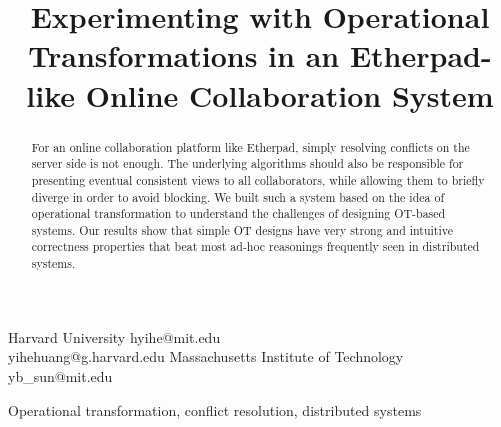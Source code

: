 \documentclass[nocopyrightspace]{sigplanconf}
\begin{document}
\setlength{\pdfpageheight}{\paperheight}
\setlength{\pdfpagewidth}{\paperwidth}






\title{Experimenting with Operational Transformations in an Etherpad-like Online Collaboration System}

  {Harvard University}
  {hyihe@mit.edu\\yihehuang@g.harvard.edu}
  {Massachusetts Institute of Technology}
  {yb\_sun@mit.edu}

\maketitle

\begin{abstract}

For an online collaboration platform like Etherpad, simply resolving conflicts
on the server side is not enough. The underlying algorithms should also be
responsible for presenting eventual consistent views to all collaborators,
while allowing them to briefly diverge in order to avoid blocking. We built
such a system based on the idea of operational transformation to understand
the challenges of designing OT-based systems. Our results show that simple OT
designs have very strong and intuitive correctness properties that beat most
ad-hoc reasonings frequently seen in distributed systems.

\end{abstract}



\keywords
Operational transformation, conflict resolution, distributed systems












\end{document}
